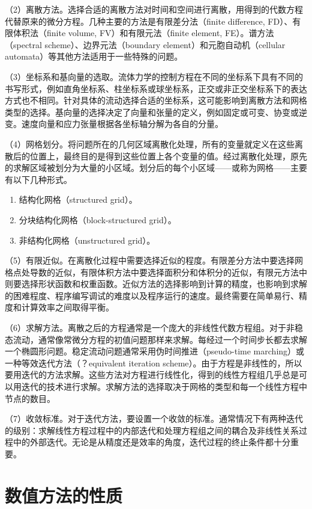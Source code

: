 （2）离散方法。选择合适的离散方法对时间和空间进行离散，用得到的代数方程代替原来的微分方程。几种主要的方法是有限差分法（finite difference, FD）、有限体积法（finite volume, FV）和有限元法（finite element, FE）。谱方法（spectral scheme）、边界元法（boundary element）和元胞自动机（cellular automata）等其他方法适用于一些特殊的问题。

（3）坐标系和基向量的选取。流体力学的控制方程在不同的坐标系下具有不同的书写形式，例如直角坐标系、柱坐标系或球坐标系，正交或非正交坐标系下的表达方式也不相同。针对具体的流动选择合适的坐标系，这可能影响到离散方法和网格类型的选择。基向量的选择决定了向量和张量的定义，例如固定或可变、协变或逆变。速度向量和应力张量根据各坐标轴分解为各自的分量。

（4）网格划分。将问题所在的几何区域离散化处理，所有的变量就定义在这些离散后的位置上，最终目的是得到这些位置上各个变量的值。经过离散化处理，原先的求解区域被划分为大量的小区域。划分后的每个小区域——或称为网格——主要有以下几种形式。

\begin{enumerate}
	\item 结构化网格（structured grid）。
	\item 分块结构化网格（block-structured grid）。
	\item 非结构化网格（unstructured grid）。
\end{enumerate}

（5）有限近似。在离散化过程中需要选择近似的程度。有限差分方法中要选择网格点处导数的近似，有限体积方法中要选择面积分和体积分的近似，有限元方法中则要选择形状函数和权重函数。近似方法的选择影响到计算的精度，也影响到求解的困难程度、程序编写调试的难度以及程序运行的速度。最终需要在简单易行、精度和计算效率之间取得平衡。

（6）求解方法。离散之后的方程通常是一个庞大的非线性代数方程组。对于非稳态流动，通常像常微分方程的初值问题那样来求解。每经过一个时间步长都去求解一个椭圆形问题。稳定流动问题通常采用伪时间推进（pseudo-time marching）或一种等效迭代方法（？equivalent iteration scheme）。由于方程是非线性的，所以要用迭代的方法求解。这些方法对方程进行线性化，得到的线性方程组几乎总是可以用迭代的技术进行求解。求解方法的选择取决于网格的类型和每一个线性方程中节点的数目。

（7）收敛标准。对于迭代方法，要设置一个收敛的标准。通常情况下有两种迭代的级别：求解线性方程过程中的内部迭代和处理方程组之间的耦合及非线性关系过程中的外部迭代。无论是从精度还是效率的角度，迭代过程的终止条件都十分重要。

\section{数值方法的性质}

